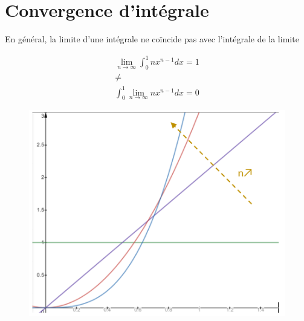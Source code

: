 \section{Convergence d'intégrale}
En général, la limite d'une intégrale ne coïncide pas avec l'intégrale de la limite
\begin{example}
    \begin{minipage}[c]{.55\linewidth}
        \begin{equation*}
            \begin{array}{c}
                \lim\limits_{n\to\infty}\int_0^1nx^{n-1}dx=1 \\[0.4cm]
                \neq \\[0.4cm]
                \int_0^1\lim\limits_{n\to\infty}nx^{n-1}dx=0
            \end{array}
        \end{equation*}
    \end{minipage}
    \begin{minipage}[c]{.4\linewidth}
        \begin{figure}[H]
            \centering
            \includegraphics[scale = 0.6]{synthese_cm12_1.jpg}
        \end{figure}
    \end{minipage}
\end{example}

